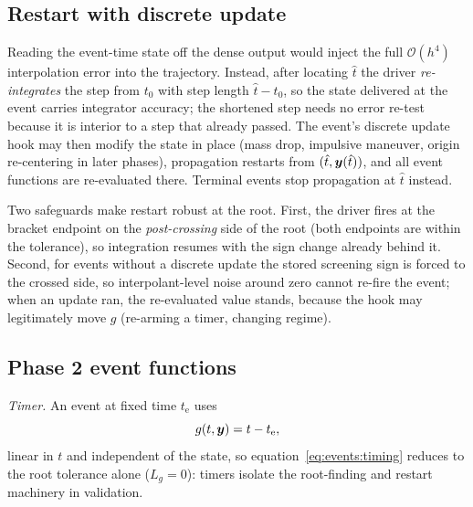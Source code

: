 \subsection{Restart with discrete update}

Reading the event-time state off the dense output would inject the full
$\mathcal{O}(h^4)$ interpolation error into the trajectory. Instead, after
locating $\hat{t}$ the driver \emph{re-integrates} the step from $t_0$ with
step length $\hat{t} - t_0$, so the state delivered at the event carries
integrator accuracy; the shortened step needs no error re-test because it
is interior to a step that already passed. The event's discrete update hook
may then modify the state in place (mass drop, impulsive maneuver, origin
re-centering in later phases), propagation restarts from
$(\hat{t}, \bm{y}(\hat{t}))$, and all event functions are re-evaluated
there. Terminal events stop propagation at $\hat{t}$ instead.

Two safeguards make restart robust at the root. First, the driver fires at
the bracket endpoint on the \emph{post-crossing} side of the root (both
endpoints are within the tolerance), so integration resumes with the sign
change already behind it. Second, for events without a discrete update the
stored screening sign is forced to the crossed side, so interpolant-level
noise around zero cannot re-fire the event; when an update ran, the
re-evaluated value stands, because the hook may legitimately move $g$
(re-arming a timer, changing regime).

\subsection{Phase 2 event functions}

\emph{Timer.} An event at fixed time $t_{\mathrm{e}}$ uses
\begin{equation}
  g(t, \bm{y}) = t - t_{\mathrm{e}},
  \label{eq:events:timer}
\end{equation}
linear in $t$ and independent of the state, so
equation~\eqref{eq:events:timing} reduces to the root tolerance alone
($L_g = 0$): timers isolate the root-finding and restart machinery in
validation.


